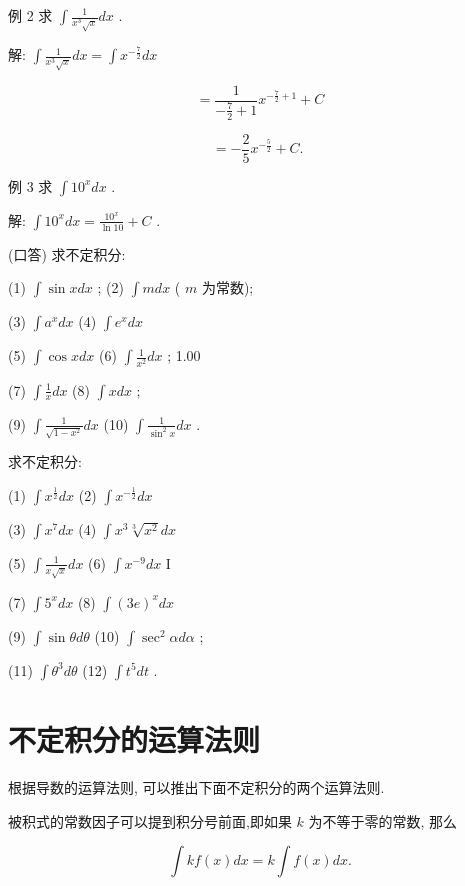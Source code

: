 \documentclass[lang=cn,newtx,10pt,scheme=chinese]{elegantbook}
\begin{document}
例 2 求 \(\int \frac{1}{{x}^{3}\sqrt{x}}{dx}\) .

解: \(\int \frac{1}{{x}^{3}\sqrt{x}}{dx} = \int {x}^{-\frac{7}{2}}{dx}\)

\[
= \frac{1}{-\frac{7}{2} + 1}{x}^{-\frac{7}{2} + 1} + C
\]

\[
= - \frac{2}{5}{x}^{-\frac{5}{2}} + C\text{. }
\]

例 3 求 \(\int {10}^{x}{dx}\) .

解: \(\int {10}^{x}{dx} = \frac{{10}^{x}}{\ln {10}} + C\) .

\begin{problemset}[练习]

\item (口答) 求不定积分:

(1) \(\int \sin {xdx}\) ; (2) \(\int {mdx}\) ( \(m\) 为常数);

(3) \(\int {a}^{x}{dx}\) (4) \(\int {e}^{x}{dx}\)

(5) \(\int \cos {xdx}\) (6) \(\int \frac{1}{{x}^{2}}{dx}\) ; 1.00

(7) \(\int \frac{1}{x}{dx}\) (8) \(\int {xdx}\) ;

(9) \(\int \frac{1}{\sqrt{1 - {x}^{2}}}{dx}\) (10) \(\int \frac{1}{{\sin }^{2}x}{dx}\) .

\item 求不定积分:

(1) \(\int {x}^{\frac{1}{2}}{dx}\) (2) \(\int {x}^{-\frac{1}{2}}{dx}\)

(3) \(\int {x}^{7}{dx}\) (4) \(\int {x}^{3}\sqrt[3]{{x}^{2}}{dx}\)

(5) \(\int \frac{1}{x\sqrt{x}}{dx}\) (6) \(\int {x}^{-9}{dx}\) I

(7) \(\int {5}^{x}{dx}\) (8) \(\int {\left( 3e\right) }^{x}{dx}\)

(9) \(\int \sin {\theta d\theta }\) (10) \(\int {\sec }^{2}{\alpha d\alpha }\) ;

(11) \(\int {\theta }^{3}{d\theta }\) (12) \(\int {t}^{5}{dt}\) .

\end{problemset}

\section{不定积分的运算法则}

根据导数的运算法则, 可以推出下面不定积分的两个运算法则.
\begin{proposition}[不定积分法则1]

被积式的常数因子可以提到积分号前面,即如果 \(k\) 为不等于零的常数, 那么

\[
\int {kf}\left( x\right) {dx} = k\int f\left( x\right) {dx}.
\]

\end{proposition}
\end{document}
